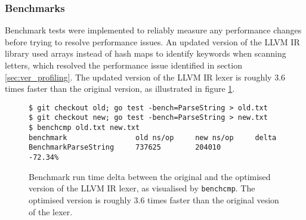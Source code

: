 
\subsubsection{Benchmarks}
\label{sec:ver_benchmarks}

Benchmark tests were implemented to reliably measure any performance changes before trying to resolve performance issues. An updated version of the LLVM IR library used arrays instead of hash maps to identify keywords when scanning letters, which resolved the performance issue identified in section \ref{sec:ver_profiling}. The updated version of the LLVM IR lexer is roughly 3.6 times faster than the original version, as illustrated in figure \ref{fig:benchmark_delta}.

\begin{figure}[htbp]
	\begin{center}
		\begin{verbatim}
$ git checkout old; go test -bench=ParseString > old.txt
$ git checkout new; go test -bench=ParseString > new.txt
$ benchcmp old.txt new.txt
benchmark                old ns/op     new ns/op     delta
BenchmarkParseString     737625        204010        -72.34%
		\end{verbatim}
		\caption{Benchmark run time delta between the original and the optimised version of the LLVM IR lexer, as visualised by \texttt{benchcmp}\protect\footnotemark. The optimised version is roughly 3.6 times faster than the original vesion of the lexer.}
		\label{fig:benchmark_delta}
	\end{center}
\end{figure}
